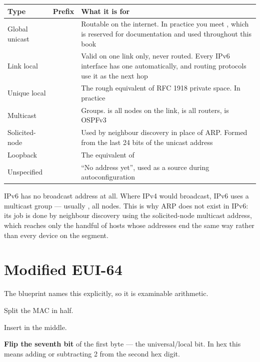 \begin{longtable}{@{}L{3.0cm}L{3.4cm}L{8.8cm}@{}}
\toprule
{}
\textbf{Type} & \textbf{Prefix} & \textbf{What it is for} \\
\midrule
\endhead
Global unicast &  & Routable on the internet. In practice you meet
, which is reserved for documentation and used throughout
this book \\
Link local &  & Valid on one link only, never routed. Every IPv6
interface has one automatically, and routing protocols use it as the next hop \\
Unique local &  & The rough equivalent of RFC 1918 private space.
In practice  \\
Multicast &  & Groups.  is all nodes on the link,
 is all routers,  is OSPFv3 \\
Solicited-node &  & Used by neighbour discovery in place
of ARP. Formed from the last 24 bits of the unicast address \\
Loopback &  & The equivalent of  \\
Unspecified & \cmd{::} & ``No address yet'', used as a source during
autoconfiguration \\
\bottomrule
\end{longtable}

\begin{alertbox}
IPv6 has no broadcast address at all. Where IPv4 would broadcast, IPv6 uses a
multicast group --- usually , all nodes. This is why ARP does not
exist in IPv6: its job is done by neighbour discovery using the solicited-node
multicast address, which reaches only the handful of hosts whose addresses end
the same way rather than every device on the segment.
\end{alertbox}

\section{Modified EUI-64}

The blueprint names this explicitly, so it is examinable arithmetic.

\begin{conceptbox}
\begin{tightnum}
  \item Split the MAC in half.
  \item Insert  in the middle.
  \item \textbf{Flip the seventh bit} of the first byte --- the universal/local
        bit. In hex this means adding or subtracting 2 from the second hex digit.
\end{tightnum}
\end{conceptbox}

